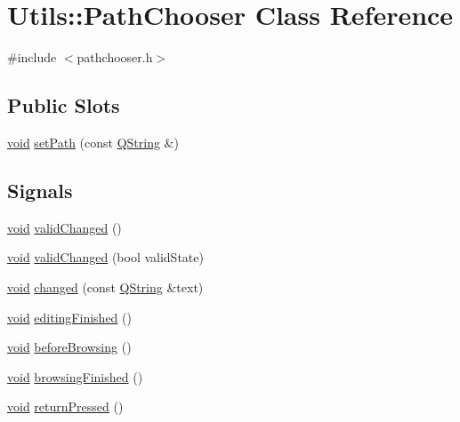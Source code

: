 \hypertarget{class_utils_1_1_path_chooser}{\section{\-Utils\-:\-:\-Path\-Chooser \-Class \-Reference}
\label{class_utils_1_1_path_chooser}
}


{\ttfamily \#include $<$pathchooser.\-h$>$}

\subsection*{\-Public \-Slots}
\begin{DoxyCompactItemize}
\item 
\hyperlink{group___u_a_v_objects_plugin_ga444cf2ff3f0ecbe028adce838d373f5c}{void} \hyperlink{class_utils_1_1_path_chooser_a203c904fd86a0b7826b83b54bf711a53}{set\-Path} (const \hyperlink{group___u_a_v_objects_plugin_gab9d252f49c333c94a72f97ce3105a32d}{\-Q\-String} \&)
\end{DoxyCompactItemize}
\subsection*{\-Signals}
\begin{DoxyCompactItemize}
\item 
\hyperlink{group___u_a_v_objects_plugin_ga444cf2ff3f0ecbe028adce838d373f5c}{void} \hyperlink{class_utils_1_1_path_chooser_ac1d7f5524c1880f653e4bc1f49dd9e49}{valid\-Changed} ()
\item 
\hyperlink{group___u_a_v_objects_plugin_ga444cf2ff3f0ecbe028adce838d373f5c}{void} \hyperlink{class_utils_1_1_path_chooser_aa8c2c373187300d468101070296ed3c6}{valid\-Changed} (bool valid\-State)
\item 
\hyperlink{group___u_a_v_objects_plugin_ga444cf2ff3f0ecbe028adce838d373f5c}{void} \hyperlink{class_utils_1_1_path_chooser_a366284cda68707828787df33fa592f03}{changed} (const \hyperlink{group___u_a_v_objects_plugin_gab9d252f49c333c94a72f97ce3105a32d}{\-Q\-String} \&text)
\item 
\hyperlink{group___u_a_v_objects_plugin_ga444cf2ff3f0ecbe028adce838d373f5c}{void} \hyperlink{class_utils_1_1_path_chooser_a9a00f0b253ec1bda3c5f7344b9122489}{editing\-Finished} ()
\item 
\hyperlink{group___u_a_v_objects_plugin_ga444cf2ff3f0ecbe028adce838d373f5c}{void} \hyperlink{class_utils_1_1_path_chooser_a2d8c9e6bcebc0bb67f9fef5be9beacc3}{before\-Browsing} ()
\item 
\hyperlink{group___u_a_v_objects_plugin_ga444cf2ff3f0ecbe028adce838d373f5c}{void} \hyperlink{class_utils_1_1_path_chooser_a8fda34cc1836d241723a5b9477522471}{browsing\-Finished} ()
\item 
\hyperlink{group___u_a_v_objects_plugin_ga444cf2ff3f0ecbe028adce838d373f5c}{void} \hyperlink{class_utils_1_1_path_chooser_a6ac4cd7660ed2ea98b4d17e725b4ad0a}{return\-Pressed} ()
\end{DoxyCompactItemize}


